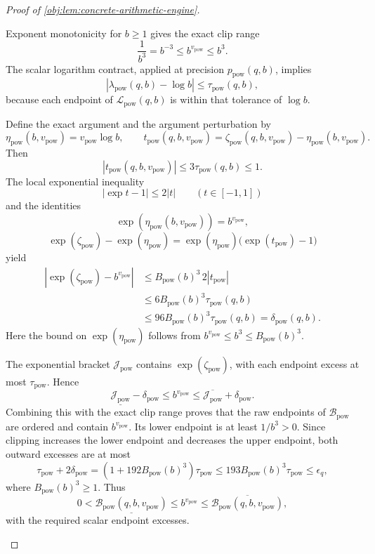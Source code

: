 \begin{proof}[Proof of \cref{obj:lem:concrete-arithmetic-engine}]
\begin{enumerate}
Exponent monotonicity for \(b\ge1\) gives the exact clip range
\[
\frac1{b^3}=b^{-3}\le b^{v_{\mathrm{pow}}}\le b^3.
\]
The scalar logarithm contract, applied at precision \(p_{\mathrm{pow}}(q,b)\), implies
\[
|\lambda_{\mathrm{pow}}(q,b)-\log b|
 \le\tau_{\mathrm{pow}}(q,b),
\]
because each endpoint of \(\mathcal L_{\mathrm{pow}}(q,b)\) is within that tolerance of \(\log b\).

Define the exact argument and the argument perturbation by
\[
\eta_{\mathrm{pow}}(b,v_{\mathrm{pow}})
 =v_{\mathrm{pow}}\log b,
\qquad
t_{\mathrm{pow}}(q,b,v_{\mathrm{pow}})
 =\zeta_{\mathrm{pow}}(q,b,v_{\mathrm{pow}})
  -\eta_{\mathrm{pow}}(b,v_{\mathrm{pow}}).
\]
Then
\[
|t_{\mathrm{pow}}(q,b,v_{\mathrm{pow}})|
 \le3\tau_{\mathrm{pow}}(q,b)\le1.
\]
The local exponential inequality
\[
|\exp t-1|\le2|t|\qquad (t\in[-1,1])
\]
and the identities
\[
\exp(\eta_{\mathrm{pow}}(b,v_{\mathrm{pow}}))
 =b^{v_{\mathrm{pow}}},
\]
\[
\exp(\zeta_{\mathrm{pow}})
 -\exp(\eta_{\mathrm{pow}})
 =
\exp(\eta_{\mathrm{pow}})\bigl(\exp(t_{\mathrm{pow}})-1\bigr)
\]
yield
\[
\begin{split}
|\exp(\zeta_{\mathrm{pow}})-b^{v_{\mathrm{pow}}}|
&\le B_{\mathrm{pow}}(b)^3\,2|t_{\mathrm{pow}}|\\
&\le6B_{\mathrm{pow}}(b)^3\tau_{\mathrm{pow}}(q,b)\\
&\le96B_{\mathrm{pow}}(b)^3\tau_{\mathrm{pow}}(q,b)
 =\delta_{\mathrm{pow}}(q,b).
\end{split}
\]
Here the bound on \(\exp(\eta_{\mathrm{pow}})\) follows from
\(b^{v_{\mathrm{pow}}}\le b^3\le B_{\mathrm{pow}}(b)^3\).

The exponential bracket \(\mathcal J_{\mathrm{pow}}\) contains
\(\exp(\zeta_{\mathrm{pow}})\), with each endpoint excess at most
\(\tau_{\mathrm{pow}}\). Hence
\[
\underline{\mathcal J_{\mathrm{pow}}}-\delta_{\mathrm{pow}}
 \le b^{v_{\mathrm{pow}}}
 \le\overline{\mathcal J_{\mathrm{pow}}}+\delta_{\mathrm{pow}}.
\]
Combining this with the exact clip range proves that the raw endpoints of
\(\mathcal B_{\mathrm{pow}}\) are ordered and contain \(b^{v_{\mathrm{pow}}}\).
Its lower endpoint is at least \(1/b^3>0\). Since clipping increases the lower endpoint and decreases the upper endpoint, both outward excesses are at most
\[
\tau_{\mathrm{pow}}+2\delta_{\mathrm{pow}}
 =(1+192B_{\mathrm{pow}}(b)^3)\tau_{\mathrm{pow}}
 \le193B_{\mathrm{pow}}(b)^3\tau_{\mathrm{pow}}
 \le\epsilon_q,
\]
where \(B_{\mathrm{pow}}(b)^3\ge1\). Thus
\[
0<\underline{\mathcal B_{\mathrm{pow}}(q,b,v_{\mathrm{pow}})}
 \le b^{v_{\mathrm{pow}}}
 \le\overline{\mathcal B_{\mathrm{pow}}(q,b,v_{\mathrm{pow}})},
\]
with the required scalar endpoint excesses.


\end{enumerate}
\end{proof}
